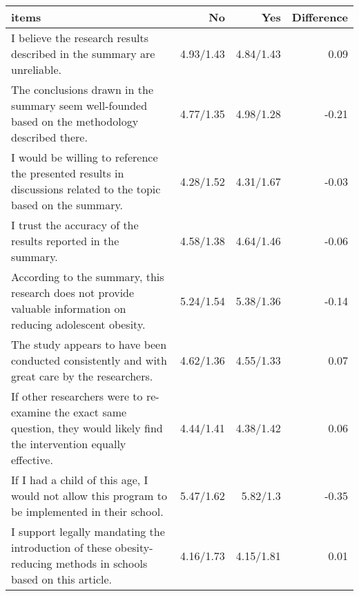 \begin{longtable}{lrrr}
\toprule
items & No & Yes & Difference \\ 
\midrule\addlinespace[2.5pt]
I believe the research results described in the summary are unreliable. & 4.93/1.43 & 4.84/1.43 & 0.09 \\ 
The conclusions drawn in the summary seem well-founded based on the methodology described there. & 4.77/1.35 & 4.98/1.28 & -0.21 \\ 
I would be willing to reference the presented results in discussions related to the topic based on the summary. & 4.28/1.52 & 4.31/1.67 & -0.03 \\ 
I trust the accuracy of the results reported in the summary. & 4.58/1.38 & 4.64/1.46 & -0.06 \\ 
According to the summary, this research does not provide valuable information on reducing adolescent obesity. & 5.24/1.54 & 5.38/1.36 & -0.14 \\ 
The study appears to have been conducted consistently and with great care by the researchers. & 4.62/1.36 & 4.55/1.33 & 0.07 \\ 
If other researchers were to re-examine the exact same question, they would likely find the intervention equally effective. & 4.44/1.41 & 4.38/1.42 & 0.06 \\ 
If I had a child of this age, I would not allow this program to be implemented in their school. & 5.47/1.62 & 5.82/1.3 & -0.35 \\ 
I support legally mandating the introduction of these obesity-reducing methods in schools based on this article. & 4.16/1.73 & 4.15/1.81 & 0.01 \\ 
\bottomrule
\end{longtable}

